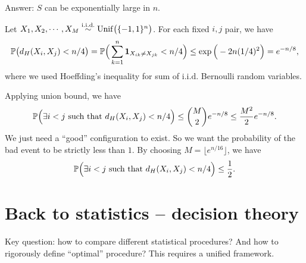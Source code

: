 \documentclass[11pt,letterpaper]{article}
\begin{document}
Answer: $S$ can be exponentially large in $n$.

Let $X_1, X_2, \cdots, X_M \overset{\mathrm{i.i.d.}}{\sim} \mathrm{Unif} \big( \{-1, 1\}^n \big)$. For each fixed $i, j$ pair, we have
\begin{align*}
 {\mathbb{P}} \big( d_H(X_i, X_j) < n/4 \big) = {\mathbb{P}} \Big( \sum_{k=1}^n \bm{1}_{X_{ik} \neq X_{jk}} < n/4 \Big) \leq \exp \Big( - 2n (1/4)^2 \Big) = e^{-n/8},
\end{align*}
where we used Hoeffding's inequality for sum of $\mathrm{i.i.d.}$ Bernoulli random variables.

Applying union bound, we have
\begin{align*}
  {\mathbb{P}} \Big( \exists i < j \text{ such that } d_H(X_i, X_j) < n/4 \Big) \leq \binom{M}{2} e^{-n/8} \leq \frac{M^2}{2} e^{-n/8}.
\end{align*}
We just need a ``good'' configuration to exist. So we want the probability of the bad event to be strictly less than $1$. By choosing $M = \lfloor e^{n/16} \rfloor$, we have
\begin{align*}
  {\mathbb{P}} \Big( \exists i < j \text{ such that } d_H(X_i, X_j) < n/4 \Big) \leq \frac{1}{2}.
\end{align*}

\section{Back to statistics -- decision theory}
Key question: how to compare different statistical procedures? And how to rigorously define ``optimal'' procedure? This requires a unified framework.
\end{document}
